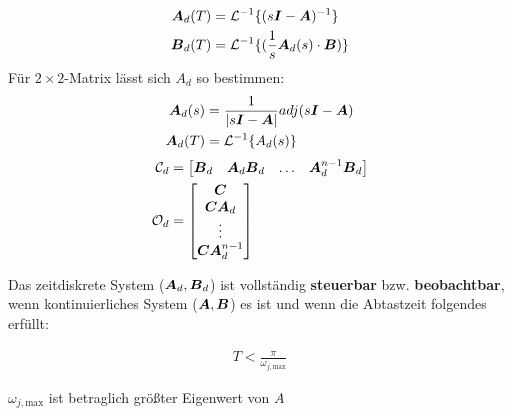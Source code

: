         \begin{tcolorbox}[colback=white!10!white,colframe=blue!30!black,title=KOCHREZEPT: Fundamentalmatrix Berechnung] 
            \begin{align*}
            \boldsymbol{A}_d(T) &= \mathcal{L}^{-1}\{(s\boldsymbol{I}-\boldsymbol{A})^{-1}\}\\
            \boldsymbol{B}_d(T) &= \mathcal{L}^{-1}\{(\frac{1}{s}\boldsymbol{A}_d(s)\cdot \boldsymbol{B})\}
            \end{align*}
            Für $2\times2$-Matrix lässt sich $A_d$ so bestimmen:
            \begin{align*}
                \boldsymbol{A}_d(s) &= \frac{1}{|s\boldsymbol{I}-\boldsymbol{A}|} adj(s\boldsymbol{I}-\boldsymbol{A})\\
                \boldsymbol{A}_d(T) &= \mathcal{L}^{-1}\{A_d(s)\}
            \end{align*}
            \tcblower
            \begin{align*}
                \mathcal{C}_d &= \begin{bmatrix}
                \boldsymbol{B}_d & \boldsymbol{A}_d\boldsymbol{B}_d & \ldots & \boldsymbol{A}_d^{n-1}\boldsymbol{B}_d
                \end{bmatrix}\\
                \mathcal{O}_d &= \begin{bmatrix}
                \boldsymbol{C} \\\boldsymbol{C}\boldsymbol{A}_d \\ \vdots \\ \boldsymbol{C}\boldsymbol{A}_d^{n-1}
                \end{bmatrix}
            \end{align*}
            \begin{tcolorbox}[colback=white!10!white,colframe=gray!70!black,title=Steuerbarkeit und Beobachtbarkeit]
                Das zeitdiskrete System ($\boldsymbol{A}_d,\boldsymbol{B}_d$) ist vollständig \textbf{steuerbar} bzw. \textbf{beobachtbar}, wenn  kontinuierliches System ($\boldsymbol{A},\boldsymbol{B}$)  es ist und wenn die Abtastzeit folgendes erfüllt:
                 
                \begin{align*}
                    T < \frac{\pi}{\omega_{j,\text{max}}}
                \end{align*}
                
                $\omega_{j,\text{max}}$ ist betraglich größter Eigenwert von $A$
            \end{tcolorbox}    
        \end{tcolorbox}
        \columnbreak
            
